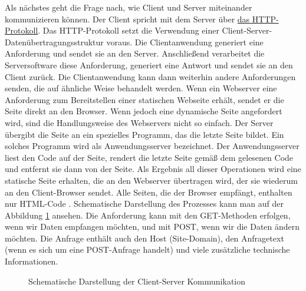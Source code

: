 Als nächstes geht die Frage nach, wie Client und Server miteinander kommunizieren können. Der Client spricht mit dem Server über \hyperref[sec:appendix:http]{das HTTP-Protokoll}. Das HTTP-Protokoll setzt die Verwendung einer Client-Server-Datenübertragungsstruktur voraus. Die Clientanwendung generiert eine Anforderung und sendet sie an den Server. Anschließend verarbeitet die Serversoftware diese Anforderung, generiert eine Antwort und sendet sie an den Client zurück. Die Clientanwendung kann dann weiterhin andere Anforderungen senden, die auf ähnliche Weise behandelt werden. Wenn ein Webserver eine Anforderung zum Bereitstellen einer statischen Webseite erhält, sendet er die Seite direkt an den Browser.\cite{website:2} Wenn jedoch eine dynamische Seite angefordert wird, sind die Handlungsweise des Webservers nicht so einfach. Der Server übergibt die Seite an ein spezielles Programm, das die letzte Seite bildet. Ein solches Programm wird als Anwendungsserver bezeichnet. Der Anwendungsserver liest den Code auf der Seite, rendert die letzte Seite gemäß dem gelesenen Code und entfernt sie dann von der Seite. Als Ergebnis all dieser Operationen wird eine statische Seite erhalten, die an den Webserver übertragen wird, der sie wiederum an den Client-Browser sendet. Alle Seiten, die der Browser empfängt, enthalten nur HTML-Code \cite{website:2}. Schematische Darstellung des Prozesses kann man auf der Abbildung \ref{fig:client-server}\cite{website:2} ansehen. Die Anforderung kann mit den GET-Methoden erfolgen, wenn wir Daten empfangen möchten, und mit POST, wenn wir die Daten ändern möchten. Die Anfrage enthält auch den Host (Site-Domain), den Anfragetext (wenn es sich um eine POST-Anfrage handelt) und viele zusätzliche technische Informationen. 
\begin{figure}
	\caption{Schematische Darstellung der Client-Server Kommunikation}
	\label{fig:client-server}
\end{figure}
